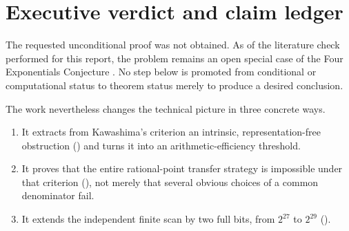 \documentclass[11pt]{article}
\theoremstyle{definition}
\begin{document}
\tableofcontents
\newpage

\section{Executive verdict and claim ledger}

\begin{conditionalbox}
The requested unconditional proof was not obtained.  As of the literature check performed for
this report, the problem remains an open special case of the Four Exponentials Conjecture
\cite{MOAE}.  No
step below is promoted from conditional or computational status to theorem status merely to
produce a desired conclusion.
\end{conditionalbox}

The work nevertheless changes the technical picture in three concrete ways.

\begin{enumerate}[label=\textbf{\arabic*.}]
\item It extracts from Kawashima's criterion an intrinsic, representation-free obstruction
      () and turns it into an arithmetic-efficiency threshold.
\item It proves that the entire rational-point transfer strategy is impossible under that
      criterion (), not merely that several
      obvious choices of a common denominator fail.
\item It extends the independent finite scan by two full bits, from $2^{27}$ to $2^{29}$
      ().
\end{enumerate}
\end{document}
